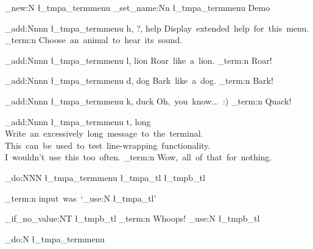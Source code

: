  \relax \ExplSyntaxOn
 \relax %

\termmenu_new:N \l_tmpa_termmenu
\termmenu_set_name:Nn \l_tmpa_termmenu { Demo }
 
\termmenu_add:Nnnn \l_tmpa_termmenu { h, ?, help }
  { Display~extended~help~for~this~menu. }
  { \msg_term:n { Choose~an~animal~to~hear~its~sound. } }
 
\termmenu_add:Nnnn \l_tmpa_termmenu { l, lion }
  { Roar~like~a~lion. }
  { \msg_term:n { Roar! } }
 
\termmenu_add:Nnnn \l_tmpa_termmenu { d, dog }
  { Bark~like~a~dog. }
  { \msg_term:n { Bark! } }
 
\termmenu_add:Nnnn \l_tmpa_termmenu { k, duck }
  { Oh,~you~know...~:) }
  { \msg_term:n { Quack! } }

\termmenu_add:Nnnn \l_tmpa_termmenu { t, long }
  {
    Write~an~excessively~long~message~to~the~terminal.~
    This~can~be~used~to~test~line-wrapping~functionality.~
    I~wouldn't~use~this~too~often.
  }
  { \msg_term:n { Wow,~all~of~that~for~nothing. } }

\termmenu_do:NNN \l_tmpa_termmenu \l_tmpa_tl \l_tmpb_tl

\msg_term:n { input~was~`\tl_use:N \l_tmpa_tl' }

\quark_if_no_value:NT \l_tmpb_tl
  { \msg_term:n { Whoops! } }
  { \tl_use:N \l_tmpb_tl }

\termmenu_do:N \l_tmpa_termmenu

\bye
